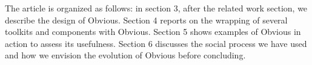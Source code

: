 \begin{comment}
A typical scenario of Obvious would be the design of
VizTree~\cite{lin01}, a VA application for monitoring
massive time-series.  VizTree encodes very long time-series of a
continuous value as a suffix tree; the details of this encoding being
beyond the scope of the paragraph scenario.  The associated tree
visualization has been implemented by specialists of data-mining and
leaves room for improvements in term of visualization and
interaction.  Using Obvious, the authors would first connect their
computed data structure to the data model of Obvious. There are two
ways of doing that: use the Obvious data-model directly or use the
native data-model implemented for mining the time-series and wrap it
with an implementation of the Obvious data-model. Both are possible
and will be chosen according to the amount of work and flexibility
offered by one option or the other. Once an Obvious data-model is
available, the authors of VisTree can start exploring which toolkit
will provide them the best support for their visualization. They can
choose among the InfoVis Toolkit, Prefuse and JUNG to visualize tree
data. Once the best one has been chosen, the interaction can be
crafted either on top of the abstraction provided by Obvious - to keep
the option of switching the final implementation - or using the native
toolkit controls to keep a tighter control of the interface. If
desired, the interface can also be improved by adding other
visualizations associated with the computation of the prefix tree or
of statistics associated with the data. If multiple-coordinated views
are required for that, Improvise visualization and views can be added
to the interface using the same data model. In that scenario, Obvious
has enabled data-mining researchers to focus on their skills and to
use state-of-the-art visualization components at a later stage of the
development of their application.

Another scenario [DDupe]

Yet another, more futuristic scenario: porting a new visualization type to multiple toolkits
or allowing cross-toolkit brushing interaction.

\end{comment}

The article is organized as follows: in section 3, after the related
work section, we describe the design of Obvious. Section 4 reports on
the wrapping of several toolkits and components with Obvious. Section
5 shows examples of Obvious in action to assess its
usefulness. Section 6 discusses the social process we have used and
how we envision the evolution of Obvious before concluding.
